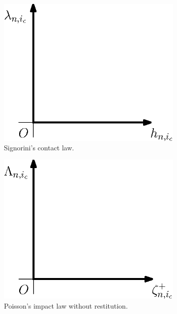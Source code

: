 \documentclass[../DC2017114Bouma.tex]{subfiles}
\begin{document}
\begin{figure}[h]
\centering
\begin{subfigure}{0.3\textwidth}
\centering
\includegraphics[width=\linewidth]{signorinicontact.eps}
\caption{Signorini's contact law.}\label{fig:signorinicontact}
\end{subfigure}
\qquad
\begin{subfigure}{0.3\textwidth}
\centering
\includegraphics[width=\linewidth]{poissonimpact.eps}
\caption{Poisson's impact law without restitution.}\label{fig:poissonimpact}
\end{subfigure}
\caption{}
\end{figure}
\end{document}
